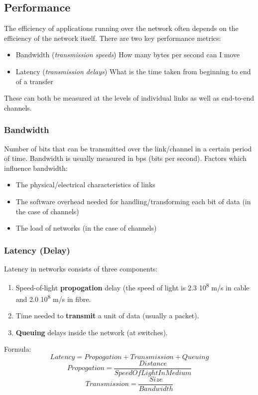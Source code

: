 \documentclass{article}%
\begin{document}
\subsection{Performance}
\label{sec:org8dc7222}
The efficiency of applications running over the network often depends on the efficiency of the network itself.
There are two key performance metrics:
\begin{itemize}
\item Bandwidth (\emph{transmission speeds}) How many bytes per second can I move
\item Latency (\emph{transmission delays}) What is the time taken from beginning to end of a transfer
\end{itemize}
These can both be measured at the levels of individual links as well as end-to-end channels.

\subsubsection{Bandwidth}
\label{sec:org2ab1e60}
Number of bits that can be transmitted over the link/channel in a certain period of time.
Bandwidth is usually measured in bps (bits per second).
Factors which influence bandwidth:
\begin{itemize}
\item The physical/electrical characteristics of links
\item The software overhead needed for handling/transforming each bit of data (in the case of channels)
\item The load of networks (in the case of channels)
\end{itemize}

\subsubsection{Latency (Delay)}
\label{sec:org426f532}
Latency in networks consists of three components:
\begin{enumerate}
\item Speed-of-light \textbf{propogation} delay (the speed of light is 2.3\texttimes{} 10\textsuperscript{8} m/s in cable and 2.0 \texttimes{} 10\textsuperscript{8} m/s in fibre.
\item Time needed to \textbf{transmit} a unit of data (usually a packet).
\item \textbf{Queuing} delays inside the network (at switches).
\end{enumerate}
Formula:
\begin{equation}
Latency = Propogation + Transmission + Queuing
\end{equation}
\begin{equation}
Propogation = \frac{Distance}{SpeedOfLightInMedium}
\end{equation}
\begin{equation}
Transmission = \frac{Size}{Bandwidth}
\end{equation}
\end{document}
